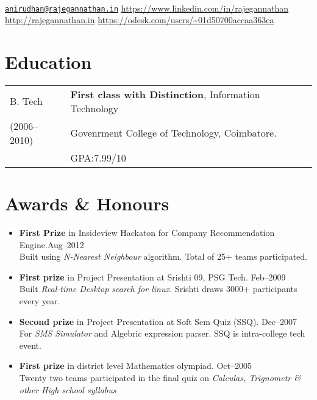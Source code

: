\documentclass{resume}
\begin{document}
\\
{\href{mailto:anirudhan@rajegannathan.in}{\nolinkurl{anirudhan@rajegannathan.in}} \hfill \url{https://www.linkedin.com/in/rajegannathan}}\\
{\url{http://rajegannathan.in} \hfill \url{https://odesk.com/users/~01d50700accaa363ea}}

\section{Education}
\begin{tabular}{>{\centering\arraybackslash}p{1in}l}
  B. Tech & \textbf{First class with Distinction}, Information Technology\\
  \small{(2006--2010)} & Govenrment College of Technology, Coimbatore.\\
    & GPA:\@ 7.99/10
\end{tabular}

\section{Awards \& Honours}
  \begin{itemize}[label={$\ast$}]
    \item \textbf{First Prize} in Insideview Hackaton for Company Recommendation Engine.\hfill Aug--2012\\
      \small{Built using \textit{N-Nearest Neighbour} algorithm.  Total of 25+ teams participated.}
    \item \textbf{First prize} in Project Presentation at Srishti 09, PSG Tech. \hfill Feb--2009\\
      \small{Built \textit{Real-time Desktop search for linux.} Srishti draws 3000+ participants every year.}
    \item \textbf{Second prize} in Project Presentation at Soft Sem Quiz (SSQ). \hfill Dec--2007\\
      \small{For \textit{SMS Simulator} and Algebric expression parser. SSQ is intra-college tech event.}
    \item \textbf{First prize} in district level Mathematics olympiad. \hfill Oct--2005\\
      \small{Twenty two teams participated in the final quiz on \textit{Calculas, Trignometr \& other High school syllabus}}
  \end{itemize}
\end{document}
